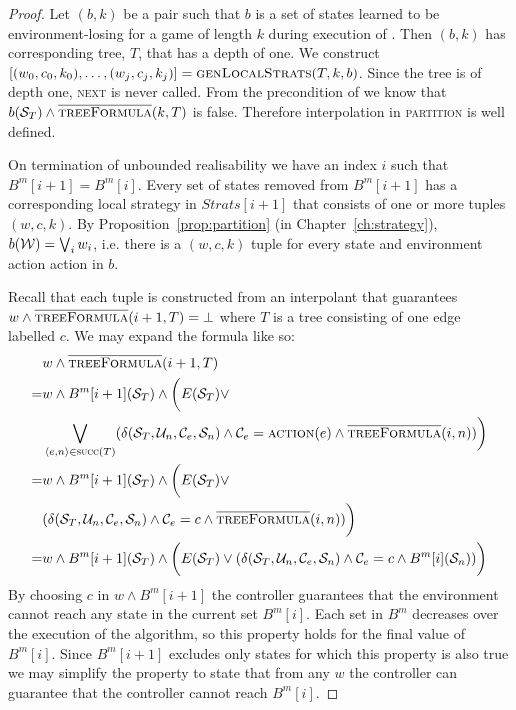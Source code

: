 \begin{proof}
    Let $(b, k)$ be a pair such that $b$ is a set of states learned to be environment-losing for a game of length $k$ during execution of . Then $(b, k)$ has corresponding tree, $T$, that has a depth of one. We construct $[(w_0, c_0, k_0), \ldots, (w_j, c_j, k_j)] = \textsc{genLocalStrats}(T, k, b)$. Since the tree is of depth one, \textsc{next} is never called.  From the precondition of  we know that $b(\mathcal{S}_T) \land \textsc{$\overline{\mbox{treeFormula}}$}(k, T)$ is false. Therefore interpolation in \textsc{partition} is well defined. 
    
    On termination of unbounded realisability we have an index $i$ such that $B^m[i+1] = B^m[i]$.  Every set of states removed from $B^m[i+1]$ has a corresponding local strategy in $Strats[i+1]$ that consists of one or more tuples $(w, c, k)$. By Proposition~\ref{prop:partition} (in Chapter~\ref{ch:strategy}), $b(\mathcal{W}) = \bigvee_i w_i$, i.e. there is a $(w, c, k)$ tuple for every state and environment action action in $b$.  
    
    Recall that each tuple is constructed from an interpolant that guarantees $w \land \textsc{$\overline{\mbox{treeFormula}}$}(i+1, T) = \bot$ where $T$ is a tree consisting of one edge labelled $c$. We may expand the formula like so:
    \begin{align*}
        &{} w \land \textsc{$\overline{\mbox{treeFormula}}$}(i+1, T) \\
        = &{} w \land B^m[i+1](\mathcal{S}_T) \land \bigg( E(\mathcal{S}_T) \lor \\
    &{} \bigvee_{\langle e, n \rangle \in \textsc{succ}(T)}(\delta(\mathcal{S}_T, \mathcal{U}_n, \mathcal{C}_e, \mathcal{S}_n) \land \mathcal{C}_e = \textsc{action}(e) \land \textsc{$\overline{\mbox{treeFormula}}$}(i, n))\bigg) \\
        = &{} w \land B^m[i+1](\mathcal{S}_T) \land \bigg( E(\mathcal{S}_T) \lor \\
          &{} (\delta(\mathcal{S}_T, \mathcal{U}_n, \mathcal{C}_e, \mathcal{S}_n) \land \mathcal{C}_e = c \land \textsc{$\overline{\mbox{treeFormula}}$}(i, n))\bigg) \\
        = &{} w \land B^m[i+1](\mathcal{S}_T) \land \bigg( E(\mathcal{S}_T) \lor (\delta(\mathcal{S}_T, \mathcal{U}_n, \mathcal{C}_e, \mathcal{S}_n) \land \mathcal{C}_e = c \land B^m[i](\mathcal{S}_n))\bigg) \\
    \end{align*}
    By choosing $c$ in $w \land B^m[i+1]$ the controller guarantees that the environment cannot reach any state in the current set $B^m[i]$. Each set in $B^m$ decreases over the execution of the algorithm, so this property holds for the final value of $B^m[i]$. Since $B^m[i+1]$ excludes only states for which this property is also true we may simplify the property to state that from any $w$ the controller can guarantee that the controller cannot reach $B^m[i]$. 
    

\end{proof}
